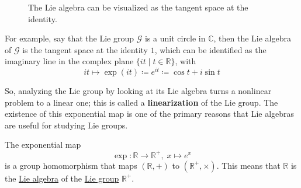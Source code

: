 \documentclass{article}
\newcounter{example}[section]
\begin{document}
    \begin{figure}[H]
      \centering 
      \caption{The Lie algebra can be visualized as the tangent space at the identity.} 
      \label{fig:lie_algebra_tangent_space}
    \end{figure}

    For example, say that the Lie group $\mathcal{G}$ is a unit circle in $\mathbb{C}$, then the Lie algebra of $\mathcal{G}$ is the tangent space at the identity $1$, which can be identified as the imaginary line in the complex plane $\{i t \; | \; t \in \mathbb{R}\}$, with 
    \begin{equation}
      i t \mapsto \exp(it) \coloneqq e^{it} \coloneqq \cos{t} + i \sin{t}
    \end{equation}

    \begin{center}
    \end{center}
    So, analyzing the Lie group by looking at its Lie algebra turns a nonlinear problem to a linear one; this is called a \textbf{linearization} of the Lie group. The existence of this exponential map is one of the primary reasons that Lie algebras are useful for studying Lie groups. 

    \begin{example}
      \label{ex:the-exponential-map-as-a-group-homomorphism}
      The exponential map 
      \begin{equation}
        \exp: \mathbb{R} \rightarrow \mathbb{R}^+, \; x \mapsto e^x
      \end{equation}
      is a group homomorphism that maps $(\mathbb{R}, +)$ to $(\mathbb{R}^+, \times)$. This means that $\mathbb{R}$ is the \hyperref[def:lie-algebra]{Lie algebra} of the \hyperref[def:lie-group]{Lie group} $\mathbb{R}^+$. 
    \end{example}
\end{document}
